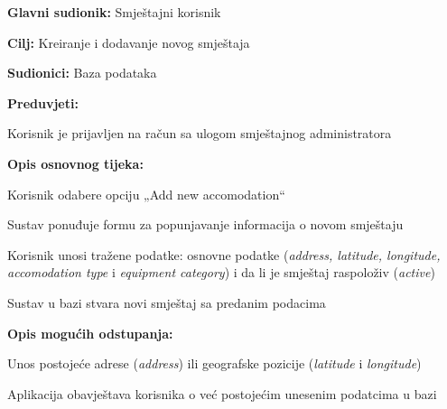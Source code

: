 					
					\noindent {}
					\begin{packed_item}
						\item \textbf{Glavni sudionik:} Smještajni korisnik
						\item  \textbf{Cilj:} Kreiranje i dodavanje novog smještaja
						\item  \textbf{Sudionici:} Baza podataka
						\item  \textbf{Preduvjeti:}
						\item[] \begin{packed_enum}
							\item Korisnik je prijavljen na račun sa ulogom smještajnog administratora
						\end{packed_enum}
						
						\item  \textbf{Opis osnovnog tijeka:}
						\item[] \begin{packed_enum}
							\item Korisnik odabere opciju „Add new accomodation“
							\item Sustav ponuđuje formu za popunjavanje informacija o novom smještaju
							\item Korisnik unosi tražene podatke: osnovne podatke (\textit{address, latitude, longitude, accomodation type} i \textit{equipment category}) i da li je smještaj raspoloživ (\textit{active})
							\item Sustav u bazi stvara novi smještaj sa predanim podacima
						\end{packed_enum}
						
						\item  \textbf{Opis mogućih odstupanja:}
						\item[] \begin{packed_item}
							\item[3.a] Unos postojeće adrese (\textit{address}) ili geografske pozicije (\textit{latitude} i \textit{longitude})
							\item[] \begin{packed_enum}
								\item Aplikacija obavještava korisnika o već postojećim unesenim podatcima u bazi
							\end{packed_enum}
						\end{packed_item}
					\end{packed_item}
					
